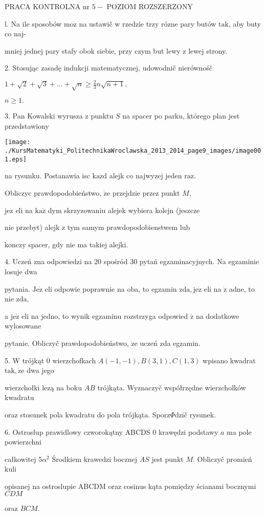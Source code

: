\documentclass[a4paper,12pt]{article}
\begin{document}
PRACA KONTROLNA nr $5 -$ POZIOM ROZSZERZONY

l. Na ile sposobów $\mathrm{m}\mathrm{o}\dot{\mathrm{z}}$ na ustawič $\mathrm{w}$ rzedzie trzy rózne pary butów $\mathrm{t}\mathrm{a}\mathrm{k}$, aby buty co naj-

mniej jednej pary stafy obok siebie, przy czym but lewy $\mathrm{z}$ lewej strony.

2. Stosując zasadę indukcji matematycznej, udowodnič nierównośč

$1+\displaystyle \sqrt{2}+\sqrt{3}+\ldots+\sqrt{n}\geq\frac{2}{3}n\sqrt{n+1},$

$n\geq 1.$

3. Pan Kowalski wyrusza $\mathrm{z}$ punktu $S$ na spacer po parku, którego plan jest przedstawiony
\begin{center}
\texttt{[image: ./KursMatematyki\_PolitechnikaWroclawska\_2013\_2014\_page9\_images/image001.eps]}
\end{center}
na rysunku. Postanawia isc $\mathrm{k}\mathrm{a}\dot{\mathrm{z}}\mathrm{d}$ alejk co najwyzej jeden $\mathrm{r}\mathrm{a}\mathrm{z}.$

Obliczyc prawdopodobieństwo, $\dot{\mathrm{z}}\mathrm{e}$ przejdzie przez punkt $M,$

$\mathrm{j}\mathrm{e}\dot{\mathrm{z}}$ eli na $\mathrm{k}\mathrm{a}\dot{\mathrm{z}}$ dym skrzyzowaniu alejek wybiera kolejn (jeszcze

nie przebyt) alejk $\mathrm{z}$ tym samym prawdopodobienstwem lub

konczy spacer, gdy nie ma takiej alejki.

4. Uczeń zna odpowiedzi na 20 spośród 30 pytań egzaminacyjnych. Na egzaminie losuje dwa

pytania. $\mathrm{J}\mathrm{e}\dot{\mathrm{z}}$ eli odpowie poprawnie na oba, to egzamin $\mathrm{z}\mathrm{d}\mathrm{a}, \mathrm{j}\mathrm{e}\dot{\mathrm{z}}$ eli na $\dot{\mathrm{z}}$ adne, to nie $\mathrm{z}\mathrm{d}\mathrm{a},$

a $\mathrm{j}\mathrm{e}\dot{\mathrm{z}}$ eli na jedno, to wynik egzaminu rozstrzyga odpowied $\acute{\mathrm{z}}$ na dodatkowe wylosowane

pytanie. Obliczyč prawdopodobieństwo, $\dot{\mathrm{z}}\mathrm{e}$ uczeń zda egzamin.

5. $\mathrm{W}$ trójkąt $0$ wierzchofkach $A(-1,-1), B(3,1), C(1,3)$ wpisano kwadrat $\mathrm{t}\mathrm{a}\mathrm{k}, \dot{\mathrm{z}}\mathrm{e}$ dwa jego

wierzchołki lezą na boku $AB$ trójkąta. Wyznaczyč współrzędne wierzcholków kwadratu

oraz stosunek pola kwadratu do pola trójkąta. Sporz$\Phi$dzič rysunek.

6. Ostrosłup prawidlowy czworokątny ABCDS $0$ krawędzi podstawy $a$ ma pole powierzchni

całkowitej $5\alpha^{2}$ Środkiem krawedzi bocznej $AS$ jest punkt $M$. Obliczyč promień kuli

opisanej na ostroslupie ABCDM oraz cosinus kąta pomiędzy ścianami bocznymi $CDM$

oraz $BCM.$
\end{document}
